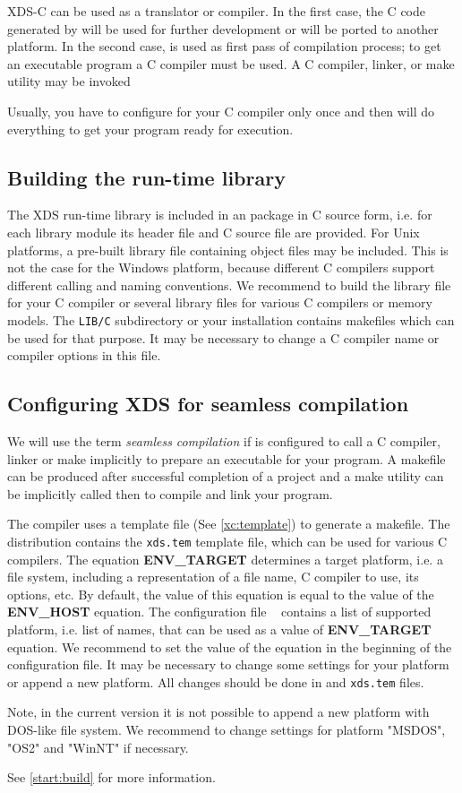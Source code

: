 \ifgenc %

XDS-C can be used as a translator or compiler.
In the first case, the C code generated by \xc{} will be used for
further development or will be ported to another platform. In the
second case, \xc{} is used as first pass of compilation process;
to get an executable program a C compiler must be used. A C compiler,
linker, or make utility may be invoked 

Usually, you have to configure \xc{} for your C compiler only once and
then \xc{} will do everything to get your program ready for execution.

\subsection{Building the run-time library}

The XDS run-time library is included in an \XDS{} package
in C source form, i.e. for each library module its header
file and C source file are provided. For Unix platforms, a
pre-built library file containing object files may be included.
This is not the case for the Windows platform,
because different C compilers support different calling and naming
conventions. We recommend to build the library file for your
C compiler or several library files for various C compilers
or memory models. The \verb'LIB/C' subdirectory or your
\XDS{} installation contains makefiles which can be used
for that purpose. It may be necessary to change a C compiler
name or compiler options in this file.

\subsection{Configuring XDS for seamless compilation}\label{config:seamless}

We will use the term {\em seamless compilation} if \XC{} is
configured to call a C compiler, linker or make implicitly to prepare
an executable for your program. A makefile can be produced after
successful completion of a project and a make utility can be implicitly
called then to compile and link your program.


The compiler uses a template file (See \ref{xc:template}) to generate
a makefile. The \XDS{} distribution contains the {\tt xds.tem} template
file, which can be used for various C compilers. The equation {\bf
ENV\_TARGET} determines a target platform, i.e. a file system,
including a representation of a file name, C compiler to use, its
options, etc.  By default, the value of this equation is equal to the
value of the {\bf ENV\_HOST} equation.  The configuration file {\tt
\cfg} contains a list of supported platform, i.e. list of names, that
can be used as a value of {\bf ENV\_TARGET} equation. We recommend to
set the value of the equation in the beginning of the configuration
file. It may be necessary to change some settings for your platform or
append a new platform. All changes should be done in {\tt \cfg} and
{\tt xds.tem} files.

Note, in the current version it is not possible to append a new
platform with DOS-like file system. We recommend to change settings
for platform "MSDOS", "OS2" and "WinNT" if necessary.

See \ref{start:build} for more information.

\fi  %
